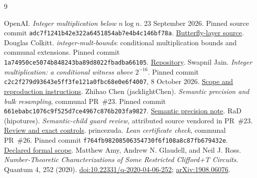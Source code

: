 \documentclass[11pt]{article}
\theoremstyle{definition}\newtheorem{definition}[theorem]{Definition}
\theoremstyle{remark}\newtheorem{remark}[theorem]{Remark}
\newcommand{\code}[1]{\nolinkurl{#1}}
\begin{document}
\begin{thebibliography}{9}
\raggedright
{} OpenAI. \emph{Integer multiplication below $n\log n$}. 23 September 2026. Pinned source commit \code{adc7f1241b42e322a6451854ab7e4b4c146bf78a}. \href{https://github.com/openai/math/blob/adc7f1241b42e322a6451854ab7e4b4c146bf78a/preprints/Integer-multiplication-below-n-log-n-September-23-2026/build/sections/05-layers.tex}{Butterfly-layer source}.
 Douglas Colkitt. \emph{integer-mult-bounds}: conditional multiplication bounds and communal extensions. Pinned commit \code{1a74950ce5074b848243ba89d8022fbadba66105}. \href{https://github.com/CrocSwap/integer-mult-bounds/tree/1a74950ce5074b848243ba89d8022fbadba66105}{Repository}.
 Swapnil Jain. \emph{Integer multiplication: a conditional witness above $2^{-16}$}. Pinned commit \code{c2c2f279d93643e5ff3fe121a0fbc68e0e6f4007}, 8 October 2026. \href{https://github.com/Swapnil-jain/integer-mult-kappa/blob/c2c2f279d93643e5ff3fe121a0fbc68e0e6f4007/README.md}{Scope and reproduction instructions}.
 Zhihao Chen (jacklightChen). \emph{Semantic precision and bulk resampling}, communal PR~\#23. Pinned commit \code{661ebabc1076c9f525d7ce4967c876b203fa9827}. \href{https://github.com/CrocSwap/integer-mult-bounds/blob/661ebabc1076c9f525d7ce4967c876b203fa9827/notes/semantic-bulk-17-note.tex}{Semantic precision note}.
 RaD (hipotures). \emph{Semantic-child guard review}, attributed source vendored in PR~\#23. \href{https://github.com/CrocSwap/integer-mult-bounds/blob/661ebabc1076c9f525d7ce4967c876b203fa9827/references/rad20/reports/review-semantic-child-guard.md}{Review and exact controls}.
 princezuda. \emph{Lean certificate check}, communal PR~\#26. Pinned commit \code{f764fb98208506354730f6f108a8c87fb679432e}. \href{https://github.com/CrocSwap/integer-mult-bounds/pull/26}{Declared formal scope}.
 Matthew Amy, Andrew N. Glaudell, and Neil J. Ross. \emph{Number-Theoretic Characterizations of Some Restricted Clifford+T Circuits}. Quantum 4, 252 (2020). \href{https://doi.org/10.22331/q-2020-04-06-252}{doi:10.22331/q-2020-04-06-252}; \href{https://arxiv.org/abs/1908.06076}{arXiv:1908.06076}.
\end{thebibliography}
\end{document}
